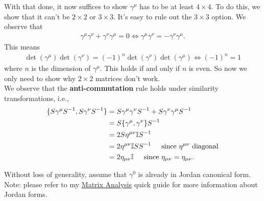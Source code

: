 \documentclass{book}
\theoremstyle{definition}
\begin{document}
With that done, it now suffices to show $\gamma^\mu$ has to be at least $4\times 4$. To do this, we show that it can't be $2\times 2$ or $3\times 3$. It's easy to rule out the $3\times 3$ option. We observe that
\begin{align}
\gamma^\mu \gamma^\nu + \gamma^\nu \gamma^\mu = 0 \iff \gamma^\mu\gamma^\nu = -\gamma^\nu\gamma^\mu.
\end{align}
This means 
\begin{align}
\det(\gamma^\mu)\det(\gamma^\nu) = (-1)^n\det(\gamma^\nu)\det(\gamma^\mu) \iff (-1)^n = 1
\end{align}
where $n$ is the dimension of $\gamma^\mu$. This holds if and only if $n$ is even. So now we only need to show why $2\times 2$ matrices don't work. \\






We observe that the \textbf{anti-commutation} rule holds under similarity transformations, i.e.,
\begin{align}
\{ S \gamma^\mu S^{-1}, S\gamma^\nu S^{-1} \} &= S\gamma^\mu \gamma^\nu S^{-1} + S \gamma^\nu \gamma^\mu S^{-1} \nonumber\\
&= S \{\gamma^\mu, \gamma^\nu\} S^{-1}\nonumber\\
&= 2 S\eta^{\mu\nu}\mathbb{I}S^{-1} \nonumber\\
&= 2\eta^{\mu\nu}\mathbb{I}SS^{-1} \hspace{0.5cm}\text{since } \eta^{\mu\nu} \text{ diagonal} \nonumber\\
&= 2\eta_{\mu\nu}\mathbb{I}\hspace{0.5cm}\text{since } \eta_{\mu\nu} = \eta_{\mu\nu}.
\end{align}

Without loss of generality, assume that $\gamma^0$ is already in Jordan canonical form. Note: please refer to my \href{https://huanqbui.com/LaTeX projects/Matrix_Analysis/HuanBui_MatrixAnalysis.pdf}{\underline{Matrix Analysis}} quick guide for more information about Jordan forms. \\
\end{document}
